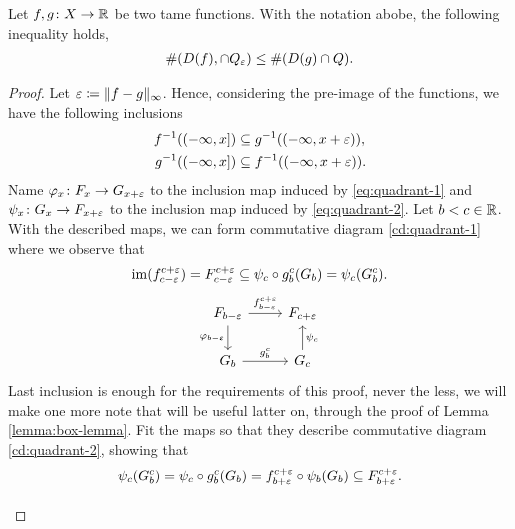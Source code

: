 \begin{lemma} \label{lemma:quadrant-lemma}
    Let $f,g \colon X \to \mathbb R $ be two tame functions. With the notation abobe, the following inequality holds,
    \begin{align}
        \#(D(f), \cap Q_\varepsilon) \leq \#(D(g) \cap Q).
    \end{align}
\end{lemma}
\begin{proof}
    Let $ \varepsilon \coloneq \|f - g\|_\infty $. Hence, considering the pre-image of the functions, we have the following inclusions
    \begin{align}
        f^{-1}((-\infty, x]) &\subseteq g^{-1}((-\infty, x+\varepsilon)), \label{eq:quadrant-1}\\
        g^{-1}((-\infty, x]) &\subseteq f^{-1}((-\infty, x+\varepsilon)). \label{eq:quadrant-2}
    \end{align}
    Name $ \varphi_x \colon F_x \to G_{x+\varepsilon} $  to the inclusion map induced by \eqref{eq:quadrant-1} and $ \psi_x \colon G_x \to F_{x+\varepsilon} $ to the inclusion map induced by \eqref{eq:quadrant-2}. Let $ b<c \in \mathbb R $. With the described maps, we can form commutative diagram \eqref{cd:quadrant-1} where we observe that
    \begin{align} 
        \operatorname{im}(f_{c-\varepsilon}^{c+\varepsilon}) = F_{c-\varepsilon}^{c+\varepsilon} \subseteq \psi_c \circ g_b^c(G_b) = \psi_c (G_b^c).
    \end{align}
    \begin{equation} \label{cd:quadrant-1}
    \begin{tikzcd}
        F_{b-\e} \arrow[r, "f_{b-\e}^{c+\e}"] \arrow[d, "\varphi_{b-\e}"']
        & F_{c+\e} \\
        G_b \arrow[r, "g_b^c"]
        & G_c \arrow[u, "\psi_c"']        
    \end{tikzcd}
    \end{equation}
    Last inclusion is enough for the requirements of this proof, never the less, we will make one more note that will be useful latter on, through the proof of Lemma \ref{lemma:box-lemma}. Fit the maps so that they describe commutative diagram \eqref{cd:quadrant-2}, showing that
    \begin{align}
        \psi_c(G_b^c) = \psi_c \circ g_b^c(G_b) = f_{b+\varepsilon}^{c+\varepsilon} \circ \psi_b(G_b) \subseteq F_{b+\varepsilon}^{c+\varepsilon}.
    \end{align}
    \begin{equation} \label{cd:quadrant-2}
    \begin{tikzcd}

\end{tikzcd}
\end{equation}
\end{proof}
